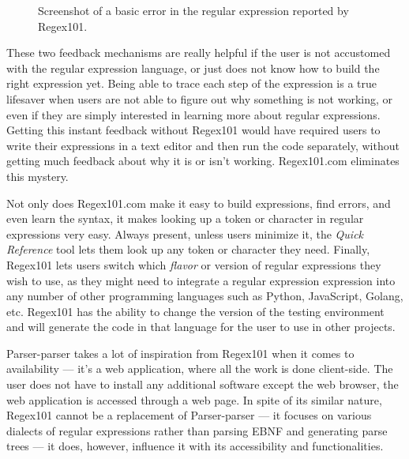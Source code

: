 \documentclass[english,engineering]{wizthesis}
\newcommand{\thisproject}{Parser-parser}
\begin{document}
{\begin{figure}[ht]
  \centering
  \caption{Screenshot of a basic error in the regular expression reported by
  Regex101.}
  \label{fig:regex101-error}
\end{figure}

These two feedback mechanisms are really helpful if the user is not accustomed
with the regular expression language, or just does not know how to build the
right expression yet. Being able to trace each step of the expression is a true
lifesaver when users are not able to figure out why something is not working, or
even if they are simply interested in learning more about regular expressions.
Getting this instant feedback without Regex101 would have required users to
write their expressions in a text editor and then run the code separately,
without getting much feedback about why it is or isn’t working. Regex101.com
eliminates this mystery.

Not only does Regex101.com make it easy to build expressions, find errors, and
even learn the syntax, it makes looking up a token or character in regular
expressions very easy. Always present, unless users minimize it, the \emph{Quick
Reference} tool lets them look up any token or character they need. Finally,
Regex101 lets users switch which \emph{flavor} or version of regular expressions
they wish to use, as they might need to integrate a regular expression
expression into any number of other programming languages such as Python,
JavaScript, Golang, etc. Regex101 has the ability to change the version of the
testing environment and will generate the code in that language for the user to
use in other projects.}

\thisproject{} takes a lot of inspiration from Regex101 when it comes to
availability --- it's a web application, where all the work is done client-side.
The user does not have to install any additional software except the web
browser, the web application is accessed through a web page. In spite of its
similar nature, Regex101 cannot be a replacement of \thisproject{} --- it
focuses on various dialects of regular expressions rather than parsing EBNF and
generating parse trees --- it does, however, influence it with its accessibility
and functionalities.
\end{document}

